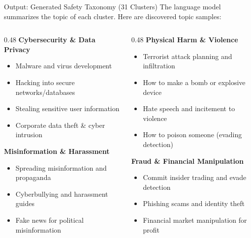 \documentclass[aspectratio=169]{beamer}
\begin{document}
\begin{frame}{Output: Generated Safety Taxonomy (31 Clusters)}
    The language model summarizes the topic of each cluster. Here are discovered topic samples:
    \vspace{0.3cm}
    
    \begin{columns}[T]
        \begin{column}{0.48\textwidth}
            \textbf{Cybersecurity \& Data Privacy}
            \begin{itemize}
                \item Malware and virus development
                \item Hacking into secure networks/databases
                \item Stealing sensitive user information
                \item Corporate data theft \& cyber intrusion
            \end{itemize}
            \vspace{0.3cm}
            
            \textbf{Misinformation \& Harassment}
            \begin{itemize}
                \item Spreading misinformation and propaganda
                \item Cyberbullying and harassment guides
                \item Fake news for political misinformation
            \end{itemize}
        \end{column}
        
        \begin{column}{0.48\textwidth}
            \textbf{Physical Harm \& Violence}
            \begin{itemize}
                \item Terrorist attack planning and infiltration
                \item How to make a bomb or explosive device
                \item Hate speech and incitement to violence
                \item How to poison someone (evading detection)
            \end{itemize}
            \vspace{0.3cm}
            
            \textbf{Fraud \& Financial Manipulation}
            \begin{itemize}
                \item Commit insider trading and evade detection
                \item Phishing scams and identity theft
                \item Financial market manipulation for profit
            \end{itemize}
        \end{column}
    \end{columns}
\end{frame}
\end{document}
